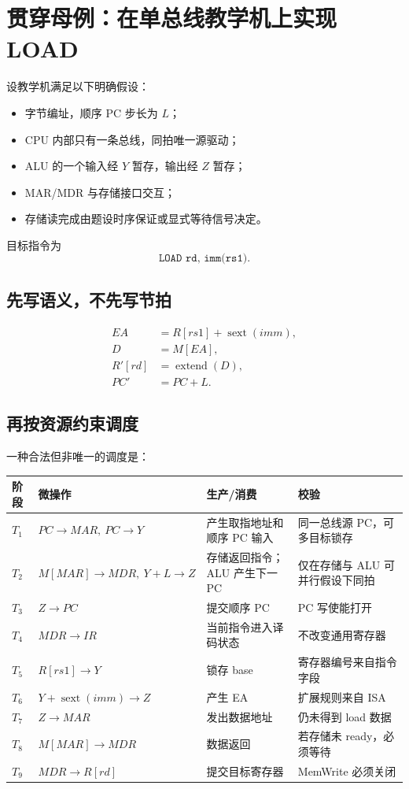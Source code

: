 \documentclass[UTF8,fontset=fandol,11pt,a4paper]{ctexart}
\newcommand{\code}[1]{\texttt{#1}}
\begin{document}
\section{贯穿母例：在单总线教学机上实现 LOAD}

设教学机满足以下明确假设：
\begin{itemize}
  \item 字节编址，顺序 PC 步长为 $L$；
  \item CPU 内部只有一条总线，同拍唯一源驱动；
  \item ALU 的一个输入经 $Y$ 暂存，输出经 $Z$ 暂存；
  \item MAR/MDR 与存储接口交互；
  \item 存储读完成由题设时序保证或显式等待信号决定。
\end{itemize}

目标指令为
\[
\code{LOAD rd, imm(rs1)}.
\]

\subsection{先写语义，不先写节拍}
\begin{align*}
EA&=R[rs1]+\operatorname{sext}(imm),\\
D&=M[EA],\\
R'[rd]&=\operatorname{extend}(D),\\
PC'&=PC+L.
\end{align*}

\subsection{再按资源约束调度}

一种合法但非唯一的调度是：
\begin{center}
\small
\begin{tabularx}{\linewidth}{C{1.1cm}L{4.4cm}YY}
\toprule
阶段 & 微操作 & 生产/消费 & 校验 \\
\midrule
$T_1$ & $PC\to MAR,\ PC\to Y$ & 产生取指地址和顺序 PC 输入 & 同一总线源 PC，可多目标锁存 \\
$T_2$ & $M[MAR]\to MDR,\ Y+L\to Z$ & 存储返回指令；ALU 产生下一 PC & 仅在存储与 ALU 可并行假设下同拍 \\
$T_3$ & $Z\to PC$ & 提交顺序 PC & PC 写使能打开 \\
$T_4$ & $MDR\to IR$ & 当前指令进入译码状态 & 不改变通用寄存器 \\
$T_5$ & $R[rs1]\to Y$ & 锁存 base & 寄存器编号来自指令字段 \\
$T_6$ & $Y+\operatorname{sext}(imm)\to Z$ & 产生 EA & 扩展规则来自 ISA \\
$T_7$ & $Z\to MAR$ & 发出数据地址 & 仍未得到 load 数据 \\
$T_8$ & $M[MAR]\to MDR$ & 数据返回 & 若存储未 ready，必须等待 \\
$T_9$ & $MDR\to R[rd]$ & 提交目标寄存器 & MemWrite 必须关闭 \\
\bottomrule
\end{tabularx}
\end{center}
\end{document}
